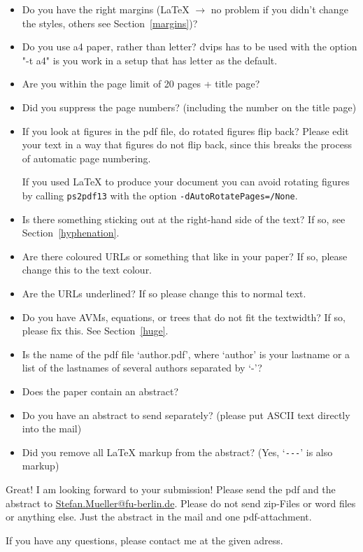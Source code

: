 \documentclass[11pt,a4paper,fleqn]{article}
\begin{document}
\begin{itemize}
\item Do you have the right margins (\LaTeX{} $\to$ no problem if you didn't change
      the styles, others see Section~\ref{margins})?
\item Do you use a4 paper, rather than letter? dvips has to be used with the option "-t a4" is you
  work in a setup that has letter as the default.
\item Are you within the page limit of 20 pages + title page?
\item Did you suppress the page numbers? (including the number on the title page)
\item If you look at figures in the pdf file, do rotated figures flip back?
      Please edit your text in a way that figures do not flip back, since this
      breaks the process of automatic page numbering.

If you used \LaTeX{} to produce your document you can avoid rotating figures by calling
\verb+ps2pdf13+ with the option \verb+-dAutoRotatePages=/None+.
\item Is there something sticking out at the right-hand side of the text?
      If so, see Section~\ref{hyphenation}.
\item Are there coloured URLs or something that like in your paper? If so,
      please change this to the text colour.
\item Are the URLs underlined? If so please change this to normal text.
\item Do you have AVMs, equations, or trees that do not fit the textwidth?
      If so, please fix this. See Section~\ref{huge}.
\item Is the name of the pdf file `author.pdf', where `author' is your lastname or a list of the lastnames of several authors
      separated by `-'?
\item Does the paper contain an abstract?
\item Do you have an abstract to send separately? (please put ASCII text directly into the mail)
\item Did you remove all \LaTeX{} markup from the abstract? (Yes, `\verb+---+' is also markup)
\end{itemize}
%
Great! I am looking forward to your submission!
Please send the pdf and the abstract to\newline
\href{mailto:Stefan.Mueller@fu-berlin.de}{Stefan.Mueller@fu-berlin.de}. Please do not send zip-Files
or word files or anything else. Just the abstract in the mail and one pdf-attachment.



If you have any questions, please contact me at the given adress.



\end{document}
